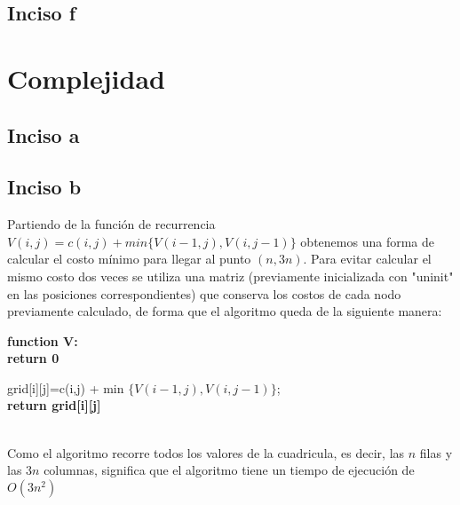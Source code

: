 \documentclass[11pt]{article}
\begin{document}
\subsection{Inciso f}

\pagebreak
\section{Complejidad}
\subsection{Inciso a}
\subsection{Inciso b}
Partiendo de la función de recurrencia $V(i, j) = c(i, j) + min \{V(i-1, j), V(i, j-1)\}$ obtenemos una forma de calcular el costo mínimo para llegar al punto $(n, 3n)$. Para evitar calcular el mismo costo dos veces se utiliza una matriz (previamente inicializada con "uninit" en las posiciones correspondientes) que conserva los costos de cada nodo previamente calculado, de forma que el algoritmo queda de la siguiente manera:
\begin{algorithm}
\textbf{function V:}\\

{
	\textbf{return 0}
}

{
    grid[i][j]=c(i,j) + min $\{V(i-1, j), V(i, j-1)\}$;\\
}
	\textbf{return grid[i][j]}


\end{algorithm}\\
Como el algoritmo recorre todos los valores de la cuadricula, es decir, las $n$ filas y las $3n$ columnas, significa que el algoritmo tiene un tiempo de ejecución de \textbf{$O(3n^{2})$}
\end{document}
